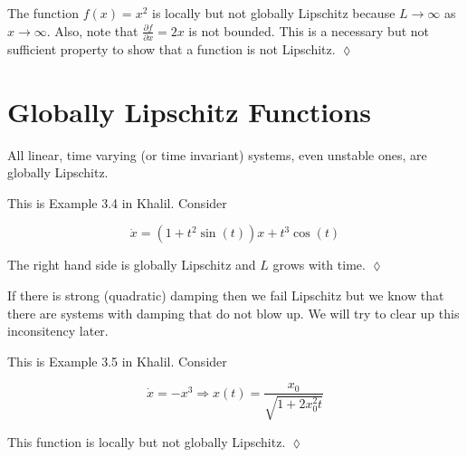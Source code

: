 \begin{example}
The function $f(x) = x^2$ is locally but not globally Lipschitz because $L\to\infty$ as $x\to\infty$.
Also, note that $\frac{\partial f}{\partial x} = 2x$ is not bounded.
This is a necessary but not sufficient property to show that a function is not Lipschitz.
$\lozenge$
\end{example}

\section{Globally Lipschitz Functions}
All linear, time varying (or time invariant) systems, even unstable ones, are globally Lipschitz.

\begin{example}
This is Example 3.4 in Khalil.
Consider

\begin{equation*}
\dot{x} = (1+t^2\sin(t))x + t^3\cos(t)
\end{equation*}

The right hand side is globally Lipschitz and $L$ grows with time.
$\lozenge$
\end{example}

If there is strong (quadratic) damping then we fail Lipschitz but we know that there are systems with damping that do not blow up.
We will try to clear up this inconsitency later.

\begin{example}
This is Example 3.5 in Khalil.
Consider

\begin{equation*}
\dot{x} = -x^3 \Rightarrow x(t) = \frac{x_0}{\sqrt{1+2x_0^2t}}
\end{equation*}

This function is locally but not globally Lipschitz.
$\lozenge$
\end{example}

